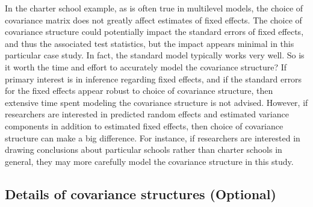 \documentclass[
]{krantz}
\begin{document}
In the charter school example, as is often true in multilevel models, the choice of covariance matrix does not greatly affect estimates of fixed effects. The choice of covariance structure could potentially impact the standard errors of fixed effects, and thus the associated test statistics, but the impact appears minimal in this particular case study. In fact, the standard model typically works very well. So is it worth the time and effort to accurately model the covariance structure? If primary interest is in inference regarding fixed effects, and if the standard errors for the fixed effects appear robust to choice of covariance structure, then extensive time spent modeling the covariance structure is not advised. However, if researchers are interested in predicted random effects and estimated variance components in addition to estimated fixed effects, then choice of covariance structure can make a big difference. For instance, if researchers are interested in drawing conclusions about particular schools rather than charter schools in general, they may more carefully model the covariance structure in this study.

\hypertarget{optionalcov}{%
\subsection{Details of covariance structures (Optional)}\label{optionalcov}}
\end{document}
